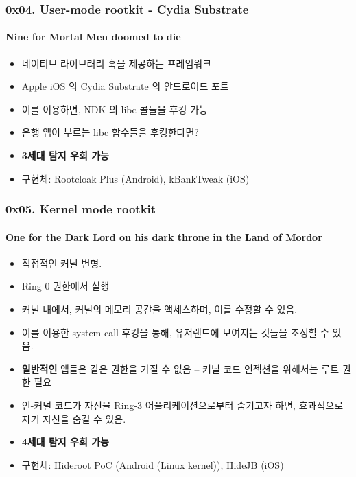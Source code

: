 \begin{frame}
  \frametitle{0x04. User-mode rootkit - Cydia Substrate}
  \framesubtitle{Nine for Mortal Men doomed to die}

  \begin{itemize}
  \item <1-> 네이티브 라이브러리 훅을 제공하는 프레임워크
  \item <2-> Apple iOS 의 Cydia Substrate 의 안드로이드 포트
  \item <3-> 이를 이용하면, NDK 의 libc 콜들을 후킹 가능
  \item <4-> 은행 앱이 부르는 libc 함수들을 후킹한다면?
  \item <5-> \textbf{3세대 탐지 우회 가능}
  \item <6-> 구현체: Rootcloak Plus (Android), kBankTweak (iOS)
  \end{itemize}
\end{frame}

\begin{frame}
  \frametitle{0x05. Kernel mode rootkit}
  \framesubtitle{One for the Dark Lord on his dark throne in the Land of Mordor}

  \begin{itemize}
  \item <1-> 직접적인 커널 변형.
  \item <2-> Ring 0 권한에서 실행
  \item <3-> 커널 내에서, 커널의 메모리 공간을 액세스하며, 이를 수정할 수 있음.
  \item <4-> 이를 이용한 system call 후킹을 통해, 유저랜드에 보여지는 것들을 조정할 수 있음.
  \item <5-> \textbf{일반적인} 앱들은 같은 권한을 가질 수 없음 -- 커널 코드 인젝션을 위해서는 루트 권한 필요
  \item <6-> 인-커널 코드가 자신을 Ring-3 어플리케이션으로부터 숨기고자 하면, 효과적으로 자기 자신을 숨길 수 있음.
  \item <7-> \textbf{4세대 탐지 우회 가능}
  \item <8-> 구현체: Hideroot PoC (Android (Linux kernel)), HideJB (iOS)
  \end{itemize}
\end{frame}

